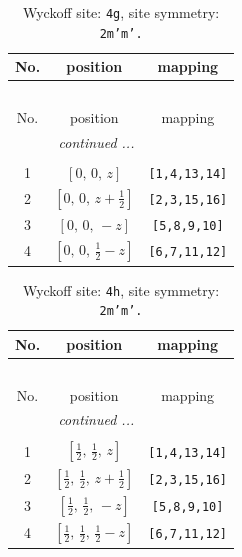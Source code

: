 \documentclass[fleqn,8pt]{jsarticle}
\begin{document}
\begin{longtable}{ccc}
\caption{Wyckoff site: {\tt 4g}, site symmetry: {\tt 2m'm'.}}
 \\
 \hline \hline
No. & position & mapping \\ \hline \endfirsthead

\multicolumn{2}{l}{\tablename\ \thetable{}} \\
 \hline \hline
No. & position & mapping \\ \hline \endhead

 \hline \hline
\multicolumn{2}{r}{\footnotesize\it continued ...} \\ \endfoot

 \hline \hline
\multicolumn{2}{r}{} \\ \endlastfoot

1 & $\left[ 0,\, 0,\, z \right]$ & {\tt [1,4,13,14]} \\ \hline
2 & $\left[ 0,\, 0,\, z + \frac{1}{2} \right]$ & {\tt [2,3,15,16]} \\ \hline
3 & $\left[ 0,\, 0,\, - z \right]$ & {\tt [5,8,9,10]} \\ \hline
4 & $\left[ 0,\, 0,\, \frac{1}{2} - z \right]$ & {\tt [6,7,11,12]} \\
\end{longtable}
\renewcommand{\arraystretch}{1.2}
\begin{longtable}{ccc}
\caption{Wyckoff site: {\tt 4h}, site symmetry: {\tt 2m'm'.}}
 \\
 \hline \hline
No. & position & mapping \\ \hline \endfirsthead

\multicolumn{2}{l}{\tablename\ \thetable{}} \\
 \hline \hline
No. & position & mapping \\ \hline \endhead

 \hline \hline
\multicolumn{2}{r}{\footnotesize\it continued ...} \\ \endfoot

 \hline \hline
\multicolumn{2}{r}{} \\ \endlastfoot

1 & $\left[ \frac{1}{2},\, \frac{1}{2},\, z \right]$ & {\tt [1,4,13,14]} \\ \hline
2 & $\left[ \frac{1}{2},\, \frac{1}{2},\, z + \frac{1}{2} \right]$ & {\tt [2,3,15,16]} \\ \hline
3 & $\left[ \frac{1}{2},\, \frac{1}{2},\, - z \right]$ & {\tt [5,8,9,10]} \\ \hline
4 & $\left[ \frac{1}{2},\, \frac{1}{2},\, \frac{1}{2} - z \right]$ & {\tt [6,7,11,12]} \\
\end{longtable}
\end{document}
